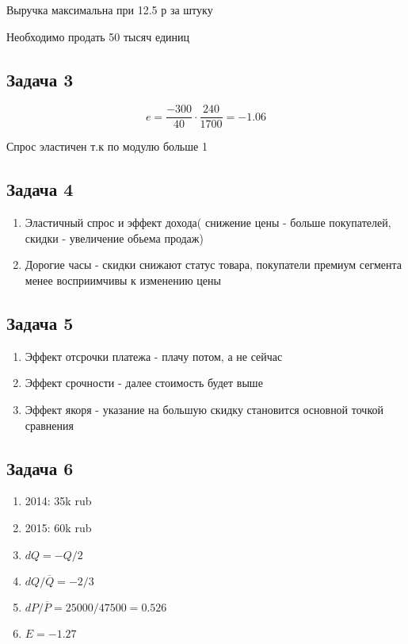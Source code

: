 \documentclass[a4paper,12pt]{article}
\begin{document}
Выручка максимальна при 12.5 р за штуку 

Необходимо продать 50 тысяч единиц

\subsection{Задача 3}

\[
e = \frac{-300}{40}\cdot \frac{240}{1700} = -1.06
\]

Спрос эластичен т.к по модулю больше 1

\subsection{Задача 4}

\begin{enumerate}
    \item Эластичный спрос и эффект дохода( снижение цены - больше покупателей, скидки - увеличение обьема продаж)
    \item Дорогие часы - скидки снижают статус товара, покупатели премиум сегмента менее восприимчивы к изменению цены
\end{enumerate}

\subsection{Задача 5}
\begin{enumerate}
    \item Эффект отсрочки платежа - плачу потом, а не сейчас
    \item Эффект срочности - далее стоимость будет выше
    \item Эффект якоря - указание на большую скидку становится основной точкой сравнения
\end{enumerate}

\subsection{Задача 6}

\begin{enumerate}
    \item 2014: 35k rub
    \item 2015: 60k rub
    \item $dQ = -Q/2$
    \item $dQ/\overline{Q} = -2/3$
    \item $dP/\overline{P} = 25000/47500 = 0.526$
    \item $E = -1.27$
\end{enumerate}
\end{document}
